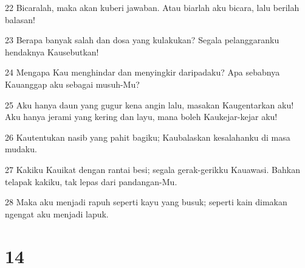 \par 22 Bicaralah, maka akan kuberi jawaban. Atau biarlah aku bicara, lalu berilah balasan!
\par 23 Berapa banyak salah dan dosa yang kulakukan? Segala pelanggaranku hendaknya Kausebutkan!
\par 24 Mengapa Kau menghindar dan menyingkir daripadaku? Apa sebabnya Kauanggap aku sebagai musuh-Mu?
\par 25 Aku hanya daun yang gugur kena angin lalu, masakan Kaugentarkan aku! Aku hanya jerami yang kering dan layu, mana boleh Kaukejar-kejar aku!
\par 26 Kautentukan nasib yang pahit bagiku; Kaubalaskan kesalahanku di masa mudaku.
\par 27 Kakiku Kauikat dengan rantai besi; segala gerak-gerikku Kauawasi. Bahkan telapak kakiku, tak lepas dari pandangan-Mu.
\par 28 Maka aku menjadi rapuh seperti kayu yang busuk; seperti kain dimakan ngengat aku menjadi lapuk.

\chapter{14}

